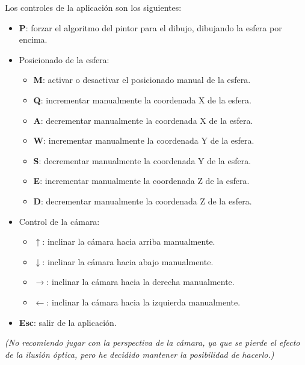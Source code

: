 \documentclass[a4paper,12pt]{article}
\begin{document}
Los controles de la aplicación son los siguientes:

\begin{itemize}
    \item \textbf{P}: forzar el algoritmo del pintor para el dibujo, dibujando la esfera por encima.
    \item Posicionado de la esfera:
    \begin{itemize}
        \item \textbf{M}: activar o desactivar el posicionado manual de la esfera.
        \item \textbf{Q}: incrementar manualmente la coordenada X de la esfera.
        \item \textbf{A}: decrementar manualmente la coordenada X de la esfera.
        \item \textbf{W}: incrementar manualmente la coordenada Y de la esfera.
        \item \textbf{S}: decrementar manualmente la coordenada Y de la esfera.
        \item \textbf{E}: incrementar manualmente la coordenada Z de la esfera.
        \item \textbf{D}: decrementar manualmente la coordenada Z de la esfera.
    \end{itemize}
    \item Control de la cámara:
    \begin{itemize}
        \item \textbf{$\uparrow$}: inclinar la cámara hacia arriba manualmente.
        \item \textbf{$\downarrow$}: inclinar la cámara hacia abajo manualmente.
        \item \textbf{$\rightarrow$}: inclinar la cámara hacia la derecha manualmente.
        \item \textbf{$\leftarrow$}: inclinar la cámara hacia la izquierda manualmente.
    \end{itemize}
    \item \textbf{Esc}: salir de la aplicación.
\end{itemize}

\textit{(No recomiendo jugar con la perspectiva de la cámara, ya que se pierde el efecto de la ilusión óptica, pero he decidido mantener la posibilidad de hacerlo.)}
\end{document}
